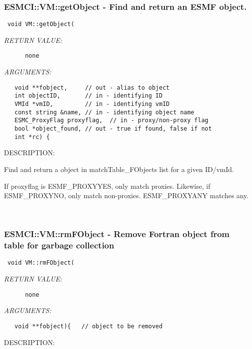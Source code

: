 {\subsubsection [ESMCI::VM::getObject] {ESMCI::VM::getObject - Find and return an ESMF object.}


  
\begin{verbatim} void VM::getObject(\end{verbatim}{\em RETURN VALUE:}
\begin{verbatim}      none\end{verbatim}{\em ARGUMENTS:}
\begin{verbatim}   void **fobject,     // out - alias to object
   int objectID,       // in - identifying ID
   VMId *vmID,         // in - identifying vmID
   const string &name, // in - identifying object name
   ESMC_ProxyFlag proxyflag,  // in - proxy/non-proxy flag
   bool *object_found, // out - true if found, false if not
   int *rc) {\end{verbatim}
{\sf DESCRIPTION:\\ }


      Find and return a object in matchTable_FObjects list for a
      given ID/vmId.
  
      If proxyflag is ESMF_PROXYYES, only match proxies.  Likewise, if
      ESMF_PROXYNO, only match non-proxies.  ESMF_PROXYANY matches any.
   
 
\mbox{}\hrulefill\
 
\subsubsection [ESMCI::VM::rmFObject] {ESMCI::VM::rmFObject - Remove Fortran object from table for garbage collection}


  
\begin{verbatim} void VM::rmFObject(\end{verbatim}{\em RETURN VALUE:}
\begin{verbatim}      none\end{verbatim}{\em ARGUMENTS:}
\begin{verbatim}   void **fobject){   // object to be removed\end{verbatim}
{\sf DESCRIPTION:\\ }


}
